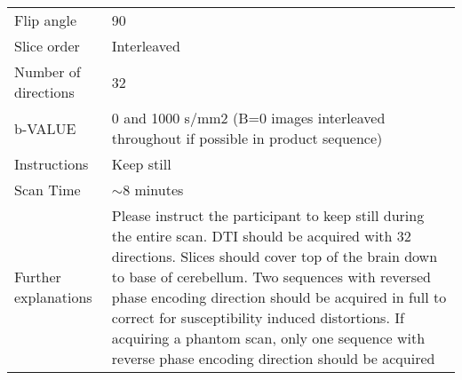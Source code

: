 \begin{table}[H]
\begin{tabularx}{\linewidth}{@{} s | X @{}}
Flip angle                								& 90                                                                                   \\
Slice order               								& Interleaved                                                                          \\
Number of directions      						& 32                                                                                   \\
b-VALUE                   								& 0 and 1000 s/mm2 (B=0 images interleaved throughout if possible in product sequence) \\
Instructions              							& Keep still                                                                           \\
Scan Time                 								& $\sim$8 minutes                                                                      \\
Further explanations      						& Please instruct the participant to keep still during the entire scan. \ac{DTI} should be acquired with 32 directions. Slices should cover top of the brain down to base of cerebellum. Two sequences with reversed phase encoding direction should be acquired in full to correct for susceptibility induced distortions. If acquiring a phantom scan, only one sequence with reverse phase encoding direction should be acquired                                                                                     
\end{tabularx}
\end{table}

